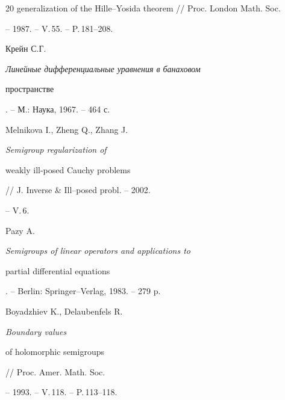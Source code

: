 \begin{thebibliography}{20}
{generalization of the Hille--Yosida theorem} // Proc. London Math. Soc.


-- 1987. -- V.\,55. -- P.\,181--208.




Крейн  С.Г. {\em Линейные дифференциальные уравнения в банаховом


пространстве}. -- М.: Наука, 1967. -- 464 с.




Melnikova I., Zheng Q., Zhang J. {\em Semigroup regularization of


weakly ill-posed Cauchy problems} // J. Inverse \& Ill--posed probl. -- 2002.


-- V.\,6.




Pazy A. {\em Semigroups of linear operators and applications to


partial differential equations}. -- Berlin: Springer--Verlag, 1983. -- 279 p.




Boyadzhiev K., Delaubenfels R. {\em Boundary values


of holomorphic semigroups} // Proc. Amer. Math. Soc.


-- 1993. -- V.\,118. -- P.\,113--118.





\end{thebibliography}





\vskip 2cm












\label{end}





